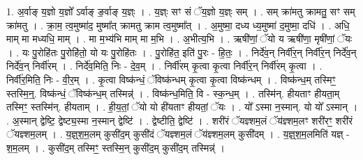 \documentclass[17pt]{extarticle}
\begin{document}
1. अ॒र्वाङ् य॒ज्ञो य॒ज्ञो᳚ ऽर्वाङ् ङ॒र्वाङ् य॒ज्ञ्ः । . य॒ज्ञ्ः सꣳ सं ॅय॒ज्ञो य॒ज्ञ्ः सम् । . सम् क्रा॑मतु क्रामतु॒ सꣳ सम् क्रा॑मतु । . क्रा॒म॒ त्व॒मुष्मा॑द॒ मुष्मा᳚त् क्रामतु क्राम त्व॒मुष्मा᳚त् । . अ॒मुष्मा॒ दध्य ध्य॒मुष्मा॑ द॒मुष्मा॒ दधि॑ । . अधि॒ माम् मा मध्यधि॒ माम् । . मा म॒भ्य॑भि माम् मा म॒भि । . अ॒भीत्य॒भि । . ऋषी॑णां॒ ॅयो य ऋषी॑णा॒ मृषी॑णां॒ ॅयः । . यः पु॒रोहि॑तः पु॒रोहि॑तो॒ यो यः पु॒रोहि॑तः । . पु॒रोहि॑त॒ इति॑ पु॒रः - हि॒तः॒ । . निर्दे॑व॒न् निर्वी॑र॒न् निर्वी॑र॒न् निर्दे॑व॒न् निर्दे॑व॒न् निर्वी॑रम् । . निर्दे॑व॒मिति॒ निः - दे॒व॒म् । . निर्वी॑रम् कृ॒त्वा कृ॒त्वा निर्वी॑र॒न् निर्वी॑रम् कृ॒त्वा । . निर्वी॑र॒मिति॒ निः - वी॒र॒म् । . कृ॒त्वा विष्क॑न्धं॒ ॅविष्क॑न्धम् कृ॒त्वा कृ॒त्वा विष्क॑न्धम् । . विष्क॑न्ध॒म् तस्मिꣳ॒॒ स्तस्मि॒न्॒. विष्क॑न्धं॒ ॅविष्क॑न्ध॒म् तस्मिन्न्॑ । . विष्क॑न्ध॒मिति॒ वि - स्क॒न्ध॒म् । . तस्मि॑न्. हीयताꣳ हीयता॒म् तस्मिꣳ॒॒ स्तस्मि॑न्. हीयताम् । . ही॒य॒तां॒ ॅयो यो ही॑यताꣳ हीयतां॒ ॅयः । . यो᳚ ऽस्मा न॒स्मान्. यो यो᳚ ऽस्मान् । . अ॒स्मान् द्वेष्टि॒ द्वेष्ट्य॒स्मा न॒स्मान् द्वेष्टि॑ । . द्वेष्टीति॒ द्वेष्टि॑ । . शरी॑रं ॅयज्ञ्शम॒लं ॅय॑ज्ञ्शम॒लꣳ शरी॑रꣳ॒॒ शरी॑रं ॅयज्ञ्शम॒लम् । . य॒ज्ञ्॒श॒म॒लम् कुसी॑द॒म् कुसी॑दं ॅयज्ञ्शम॒लं ॅय॑ज्ञ्शम॒लम् कुसी॑दम् । . य॒ज्ञ्॒श॒म॒लमिति॑ यज्ञ् - श॒म॒लम् । . कुसी॑द॒म् तस्मिꣳ॒॒ स्तस्मि॒न् कुसी॑द॒म् कुसी॑द॒म् तस्मिन्न्॑ । \newline
\end{document}

